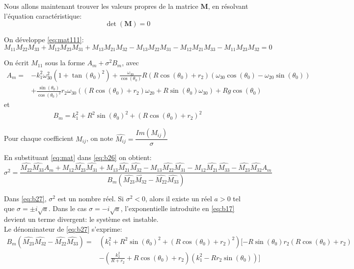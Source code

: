 Nous allons maintenant trouver les valeurs propres de la matrice $\mathbf{M}$, en résolvant l'équation caractéristique:
\begin{equation}
    \det(\mathbf{M})=0
\label{eq:mat111}
\end{equation}

On développe \ref{eq:mat111}:
\begin{equation}
    M_{11} M_{22} M_{33} + M_{12} M_{23} M_{31} + M_{13} M_{21} M_{32} - M_{13} M_{22} M_{31} - M_{12} M_{21} M_{33} - M_{11} M_{23} M_{32} = 0
\label{eq:b26}
\end{equation}

On écrit $M_{11}$ sous la forme $A_m+\sigma^2 B_m$, avec 
\begin{align}
    A_m=&-k_1^2 \omega_{30}^2(1+\tan(\theta_0)^2)
    +\frac{\omega_{30}}{\cos(\theta_0)}R(R\cos(\theta_0)+r_2)(\omega_{30}\cos(\theta_0)-\omega_{20}\sin(\theta_0)) \\
    &+ \frac{\sin(\theta_0)}{\cos(\theta_0)^2} r_2 \omega_{30}((R\cos(\theta_0)+r_2)\omega_{20}+R\sin(\theta_0)\omega_{30})+Rg\cos(\theta_0) 
\end{align}
 et
 \begin{align}
    B_m= k_1^2+R^2\sin(\theta_0)^2+ (R\cos(\theta_0)+r_2)^2 
\end{align}

Pour chaque coefficient $M_{ij}$, on note $\hat{M_{ij}}=\dfrac{Im(M_{ij})}{\sigma}$

En substituant \ref{eq:mat} dans \ref{eq:b26} on obtient:
\begin{equation}
    \sigma^2=\frac{ \hat{M_{22}}\hat{M_{33}}A_m+M_{12}\hat{M_{23}}\hat{M_{31}}+M_{13}\hat{M_{21}}\hat{M_{32}}
    -M_{13}\hat{M_{22}}\hat{M_{31}}-M_{12}\hat{M_{21}}\hat{M_{33}}- \hat{M_{23}}\hat{M_{32}}A_m}{B_m(\hat{M_{23}}\hat{M_{32}}-\hat{M_{22}}\hat{M_{33}})}
\label{eq:b27}
\end{equation}

Dans \ref{eq:b27}, $\sigma^2$ est un nombre réel.
Si $\sigma^2<0$, alors il existe un réel $a>0$ tel que $\sigma=\pm i \sqrt{a}$. Dans le cas $\sigma=- i \sqrt{a}$, l'exponentielle introduite en \ref{eq:b17} devient un terme divergent: le système est instable. \\

Le dénominateur de \ref{eq:b27} s'exprime:
\begin{align}
        B_m(\hat{M_{23}}\hat{M_{32}}-\hat{M_{22}}\hat{M_{33}})=&(k_1^2+R^2\sin(\theta_0)^2+ (R\cos(\theta_0)+r_2)^2)[-R \sin(\theta_0)r_2 (R\cos(\theta_0)+r_2) \nonumber \\
        &-(\frac{k_2^2}{R+r_2} + R\cos(\theta_0)+r_2)(k_1^2-R r_2 \sin(\theta_0))]
\label{eq:b28}
\end{align}

